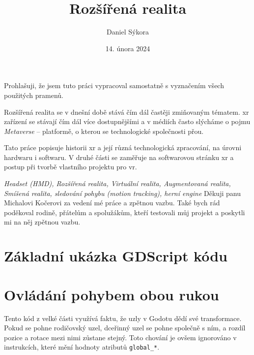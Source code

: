 \documentclass[12pt]{report}
\author{Daniel Sýkora}
\title{Rozšířená realita}
\date{14. února 2024}
\begin{document}
\mytitlepage
\prohlaseni
{
	Prohlašuji, že jsem tuto práci vypracoval samostatně s vyznačením všech použitých pramenů.
}
\abstrakt
{ %
	Rozšířená realita se v dnešní době stává čím dál častěji zmiňovaným tématem. \gls{xr} zařízení se stávají čím dál více dostupnějšími a v médiích často slýcháme o pojmu \textit{Metaverse} -- platformě, o kterou se technologické společnosti přou.

	Tato práce popisuje historii \gls{xr} a její různá technologická zpracování, na úrovni hardwaru i softwaru. V druhé části se zaměřuje na softwarovou stránku \gls{xr} a postup při tvorbě vlastního projektu pro \gls{vr}.
}
{ %
	\textit{Headset (HMD), Rozšířená realita, Virtuální realita, Augmentovaná realita, Smíšená realita, sledování pohybu (motion tracking), herní engine}
}
\podekovani
{
	Děkuji panu Michalovi Kočerovi za vedení mé práce a zpětnou vazbu. Také bych rád poděkoval rodině, přátelům a spolužákům, kteří testovali můj projekt a poskytli mi na něj zpětnou vazbu.
}

\tableofcontents
\newpage






\nocite{*}

\printbibliography

\printglossary[title={Zkratky}]

\listoffigures
{}

\appendix

\chapter{Základní ukázka GDScript kódu}\label{apx_gscript_sample}


\chapter{Ovládání pohybem obou rukou}\label{apx_gripped_object_transformation}
Tento kód z velké části využívá faktu, že uzly v Godotu dědí své transformace. Pokud se pohne rodičovský uzel, dceřinný uzel se pohne společně s ním, a rozdíl pozice a rotace mezi nimi zůstane stejný. Toto chování je ovšem ignorováno v instrukcích, které mění hodnoty atributů \texttt{global\_*}.
\end{document}
